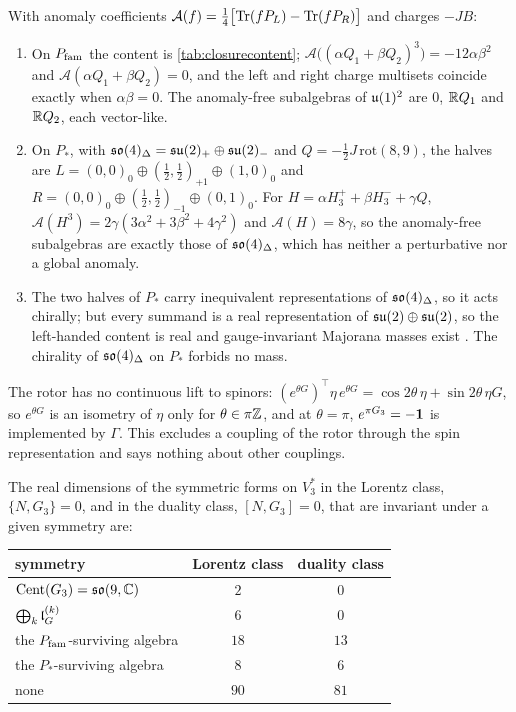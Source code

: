 \begin{theorem}
\label{thm:closurechiral}
With anomaly coefficients $\mathcal A(f)=\tfrac14\bigl[\operatorname{Tr}(fP_L)-\operatorname{Tr}(fP_R)\bigr]$ and charges $-JB$:
\begin{enumerate}[label=(\roman*),leftmargin=2.2em]
\item On $P_{\rm fam}$ the content is \cref{tab:closurecontent}; $\mathcal A\bigl((\alpha Q_1+\beta Q_2)^3\bigr)=-12\alpha\beta^2$ and $\mathcal A(\alpha Q_1+\beta Q_2)=0$, and
the left and right charge multisets coincide exactly when $\alpha\beta=0$. The anomaly-free subalgebras of $\mathfrak{u}(1)^2$ are $0$, $\mathbb{R} Q_1$ and $\mathbb{R} Q_2$,
each vector-like.
\item On $P_*$, with $\mathfrak{so}(4)_\Delta=\mathfrak{su}(2)_+\oplus\mathfrak{su}(2)_-$ and $Q=-\tfrac12J\,\mathrm{rot}(8,9)$, the halves are
$L=(0,0)_0\oplus(\tfrac12,\tfrac12)_{+1}\oplus(1,0)_0$ and $R=(0,0)_0\oplus(\tfrac12,\tfrac12)_{-1}\oplus(0,1)_0$. For $H=\alpha H^+_3+\beta H^-_3+\gamma Q$,
$\mathcal A(H^3)=2\gamma(3\alpha^2+3\beta^2+4\gamma^2)$ and $\mathcal A(H)=8\gamma$, so the anomaly-free subalgebras are exactly those of $\mathfrak{so}(4)_\Delta$, which
has neither a perturbative nor a global anomaly.
\item The two halves of $P_*$ carry inequivalent representations of $\mathfrak{so}(4)_\Delta$, so it acts chirally; but every summand is a real representation
of $\mathfrak{su}(2)\oplus\mathfrak{su}(2)$, so the left-handed content is real and gauge-invariant Majorana masses exist \cite{Suzuki2000}. The chirality of $\mathfrak{so}(4)_\Delta$
on $P_*$ forbids no mass.
\end{enumerate}
\end{theorem}

The rotor has no continuous lift to spinors: $(e^{\theta G})^{\!\top}\eta\,e^{\theta G}=\cos2\theta\,\eta+\sin2\theta\,\eta G$, so $e^{\theta G}$ is an isometry of
$\eta$ only for $\theta\in\pi\mathbb{Z}$, and at $\theta=\pi$, $e^{\pi G_3}=-\mathbf 1$ is implemented by $\Gamma$. This excludes a coupling of the rotor through the
spin representation and says nothing about other couplings.

\begin{theorem}
\label{thm:inertia3}
The real dimensions of the symmetric forms on $V_3^*$ in the Lorentz class, $\{N,G_3\}=0$, and in the duality class, $[N,G_3]=0$, that are invariant
under a given symmetry are:
\begin{center}
\begin{tabular}{@{}lcc@{}}
\toprule
symmetry & Lorentz class & duality class\\
\midrule
$\operatorname{Cent}(G_3)=\mathfrak{so}(9,\mathbb{C})$ & $2$ & $0$\\
$\bigoplus_k\mathfrak l_G^{(k)}$ & $6$ & $0$\\
the $P_{\rm fam}$-surviving algebra & $18$ & $13$\\
the $P_*$-surviving algebra & $8$ & $6$\\
none & $90$ & $81$\\
\bottomrule
\end{tabular}
\end{center}
\end{theorem}

